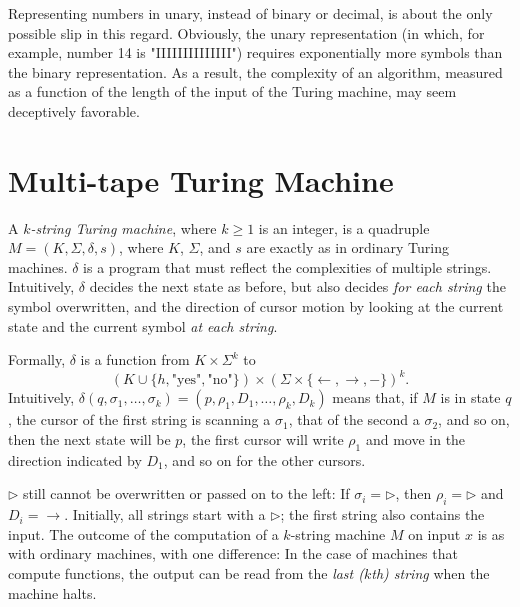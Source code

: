 \documentclass[12pt]{article}
\newcommand{\tr}{\triangleright}
\begin{document}
Representing numbers in unary, instead of binary or decimal, is about the only possible slip in this regard. Obviously, the unary representation (in which, for example, number 14 is "IIIIIIIIIIIIII") requires exponentially more symbols than the binary representation. As a result, the complexity of an algorithm, measured as a function of the length of the input of the Turing machine, may seem deceptively favorable.

\newpage
\section{Multi-tape Turing Machine}
\begin{defbox}
    A \textit{$k$-string Turing machine}, where $k \geq 1$ is an integer, is a quadruple $M = (K, \Sigma, \delta, s)$, where $K$, $\Sigma$, and $s$ are exactly as in ordinary Turing machines. $\delta$ is a program that must reflect the complexities of multiple strings. Intuitively, $\delta$ decides the next state as before, but also decides \textit{for each string} the symbol overwritten, and the direction of cursor motion by looking at the current state and the current symbol \textit{at each string}. 
    
    Formally, $\delta$ is a function from $K \times \Sigma^k$ to 
    \[
    (K \cup \{h, \text{"yes"}, \text{"no"}\}) \times (\Sigma \times \{\leftarrow, \rightarrow, -\})^k.
    \]
    Intuitively, $\delta(q, \sigma_1, \ldots, \sigma_k) = (p, \rho_1, D_1, \ldots, \rho_k, D_k)$ means that, if $M$ is in state $q$, the cursor of the first string is scanning a $\sigma_1$, that of the second a $\sigma_2$, and so on, then the next state will be $p$, the first cursor will write $\rho_1$ and move in the direction indicated by $D_1$, and so on for the other cursors. 
    
    $\tr$ still cannot be overwritten or passed on to the left: If $\sigma_i = \tr$, then $\rho_i = \tr$ and $D_i = \rightarrow$. Initially, all strings start with a $\tr$; the first string also contains the input. The outcome of the computation of a $k$-string machine $M$ on input $x$ is as with ordinary machines, with one difference: In the case of machines that compute functions, the output can be read from the \textit{last ($k$th) string} when the machine halts.
\end{defbox}
\end{document}
